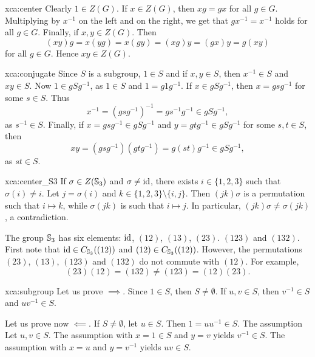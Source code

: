 \begin{sol}{xca:center}
    Clearly $1\in Z(G)$. If $x\in Z(G)$, then $xg=gx$ for all $g\in G$. Multiplying by $x^{-1}$ on the left and 
    on the right, we get that $gx^{-1}=x^{-1}$ holds for all $g\in G$. Finally, if $x,y\in Z(G)$. Then
    \[
    (xy)g=x(yg)=x(gy)=(xg)y=(gx)y=g(xy)
    \]
    for all $g\in G$. Hence $xy\in Z(G)$. 
\end{sol}


\begin{sol}{xca:conjugate}
    Since $S$ is a subgroup, $1\in S$ and 
    if $x,y\in S$, then $x^{-1}\in S$ and $xy\in S$. Now 
    $1\in gSg^{-1}$, as $1\in S$ and $1=g1g^{-1}$. If $x\in gSg^{-1}$, then 
    $x=gsg^{-1}$ for some $s\in S$. Thus 
    \[
    x^{-1}=(gsg^{-1})^{-1}=gs^{-1}g^{-1}\in gSg^{-1},
    \]
    as $s^{-1}\in S$. Finally, 
    if $x=gsg^{-1}\in gSg^{-1}$ and $y=gtg^{-1}\in gSg^{-1}$ for some $s,t\in S$, then 
    \[
    xy=(gsg^{-1})(gtg^{-1})=g(st)g^{-1}\in gSg^{-1},
    \]
    as $st\in S$. 
\end{sol}

\begin{sol}{xca:center_S3}
    If $\sigma\in Z(\mathbb{S}_3)$ and $\sigma\ne\operatorname{id}$, there exists $i\in\{1,2,3\}$ such that 
    $\sigma(i)\ne i$. Let $j=\sigma(i)$ and $k\in\{1,2,3\}\setminus\{i,j\}$. Then 
    $(jk)\sigma$ is a permutation such that $i\mapsto k$, while 
    $\sigma(jk)$ is such that $i\mapsto j$. In particular, $(jk)\sigma\ne\sigma(jk)$, a contradiction.

    The group $\mathbb{S}_3$ has six elements: $\operatorname{id}$, $(12)$, $(13)$, $(23)$. $(123)$ and $(132)$. 
    First note that $\operatorname{id}\in C_{\mathbb{S}_3}((12))$ and 
    $(12)\in C_{\mathbb{S}_3}((12))$. However, 
    the permutations $(23)$, $(13)$, $(123)$ and $(132)$ do not commute with
    $(12)$. For example, 
    \[
    (23)(12)=(132)\ne (123)=(12)(23).
    \]
\end{sol}

\begin{sol}{xca:subgroup}
    Let us prove $\implies$. Since $1\in S$, then $S\ne\emptyset$. If $u,v\in S$, then 
    $v^{-1}\in S$ and $uv^{-1}\in S$. 

    Let us prove now $\impliedby$. If $S\ne\emptyset$, let $u\in S$. Then $1=uu^{-1}\in S$. The assumption 
    Let $u,v\in S$. The assumption with $x=1\in S$ and $y=v$ yields $v^{-1}\in S$. The assumption 
    with $x=u$ and $y=v^{-1}$ yields $uv\in S$. 
\end{sol}


